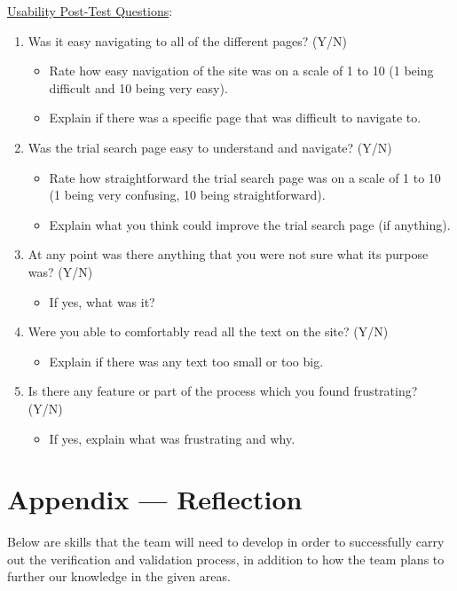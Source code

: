\documentclass[12pt, titlepage]{article}
\begin{document}
\noindent \underline{Usability Post-Test Questions}:
\begin{enumerate}
  \item Was it easy navigating to all of the different pages? (Y/N)
    \begin{itemize}
      \item Rate how easy navigation of the site was on a scale of 1 to 10 (1 being difficult and 10 being very easy).
      \item Explain if there was a specific page that was difficult to navigate to.
    \end{itemize}
	\item Was the trial search page easy to understand and navigate? (Y/N)
    \begin{itemize}
      \item Rate how straightforward the trial search page was on a scale of 1 to 10 (1 being very confusing, 10 being straightforward).
      \item Explain what you think could improve the trial search page (if anything).
    \end{itemize}
  \item At any point was there anything that you were not sure what its purpose was? (Y/N)
    \begin{itemize}
      \item If yes, what was it?
    \end{itemize}
  \item Were you able to comfortably read all the text on the site? (Y/N)
    \begin{itemize}
      \item Explain if there was any text too small or too big.
    \end{itemize}
  \item  Is there any feature or part of the process which you found frustrating? (Y/N)
    \begin{itemize}
      \item If yes, explain what was frustrating and why.
    \end{itemize}
\end{enumerate}

\newpage{}
\section*{Appendix --- Reflection}

Below are skills that the team will need to develop in order to successfully carry out the verification and validation process, in addition to how the team plans to further our knowledge in the given areas.
\end{document}
